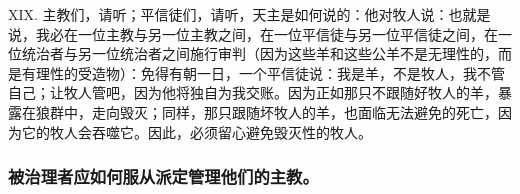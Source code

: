 XIX. 主教们，请听；平信徒们，请听，天主是如何说的：他对牧人说：也就是说，我必在一位主教与另一位主教之间，在一位平信徒与另一位平信徒之间，在一位统治者与另一位统治者之间施行审判（因为这些羊和这些公羊不是无理性的，而是有理性的受造物）：免得有朝一日，一个平信徒说：我是羊，不是牧人，我不管自己；让牧人管吧，因为他将独自为我交账。因为正如那只不跟随好牧人的羊，暴露在狼群中，走向毁灭；同样，那只跟随坏牧人的羊，也面临无法避免的死亡，因为它的牧人会吞噬它。因此，必须留心避免毁灭性的牧人。\par


\subsubsection{被治理者应如何服从派定管理他们的主教。}

